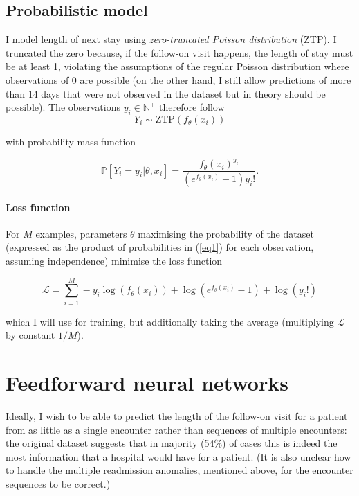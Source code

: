 \documentclass[10pt, twocolumn]{article}
\begin{document}
\subsection{Probabilistic model}
I model length of next stay using \textit{zero-truncated Poisson distribution} (ZTP). I truncated the zero because, if the follow-on visit happens, the length of stay must be at least 1, violating the assumptions of the regular Poisson distribution where observations of 0 are possible (on the other hand, I still allow predictions of more than 14 days that were not observed in the dataset but in theory should be possible). The observations $y_i \in \mathbb{N}^+$ therefore follow \[Y_i \sim \mathrm{ZTP}(f_\theta(x_i))\]

with probability mass function 

\begin{equation}
	\mathbb{P}[Y_i = y_i | \theta, x_i] = \frac{f_\theta(x_i)^{y_i}}{(e^{f_\theta(x_i)} - 1)y_i!}.
	\label{eq1}
\end{equation}

\paragraph{Loss function} For $M$ examples, parameters $\theta$ maximising the probability of the dataset (expressed as the product of probabilities in (\ref{eq1}) for each observation, assuming independence) minimise the loss function

\begin{equation}
	\mathcal{L} = \sum\limits_{i=1}^{M} -y_i \log(f_\theta(x_i)) + \log(e^{f_\theta(x_i)} - 1) + \log(y_i!)
\end{equation}

which I will use for training, but additionally taking the average (multiplying $\mathcal{L}$ by constant $1/M$).



\section{Feedforward neural networks}
Ideally, I wish to be able to predict the length of the follow-on visit for a patient from as little as a single encounter rather than sequences of multiple encounters: the original dataset suggests that in majority (54\%) of cases this is indeed the most information that a hospital would have for a patient. (It is also unclear how to handle the multiple readmission anomalies, mentioned above, for the encounter sequences to be correct.)
\end{document}
